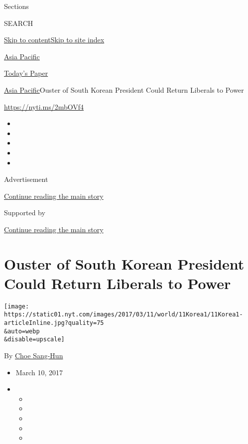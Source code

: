 Sections

SEARCH

\protect\hyperlink{site-content}{Skip to
content}\protect\hyperlink{site-index}{Skip to site index}

\href{https://www.nytimes.com/section/world/asia}{Asia Pacific}

\href{https://myaccount.nytimes.com/auth/login?response_type=cookie\&client_id=vi}{}

\href{https://www.nytimes.com/section/todayspaper}{Today's Paper}

\href{/section/world/asia}{Asia Pacific}\textbar{}Ouster of South Korean
President Could Return Liberals to Power

\url{https://nyti.ms/2mbOVf4}

\begin{itemize}
\item
\item
\item
\item
\item
\end{itemize}

Advertisement

\protect\hyperlink{after-top}{Continue reading the main story}

Supported by

\protect\hyperlink{after-sponsor}{Continue reading the main story}

\hypertarget{ouster-of-south-korean-president-could-return-liberals-to-power}{%
\section{Ouster of South Korean President Could Return Liberals to
Power}\label{ouster-of-south-korean-president-could-return-liberals-to-power}}

\texttt{[image: https://static01.nyt.com/images/2017/03/11/world/11Korea1/11Korea1-articleInline.jpg?quality=75\\\&auto=webp\\\&disable=upscale]}

By \href{http://www.nytimes.com/by/choe-sang-hun}{Choe Sang-Hun}

\begin{itemize}
\item
  March 10, 2017
\item
  \begin{itemize}
  \item
  \item
  \item
  \item
  \item
  \end{itemize}
\end{itemize}

